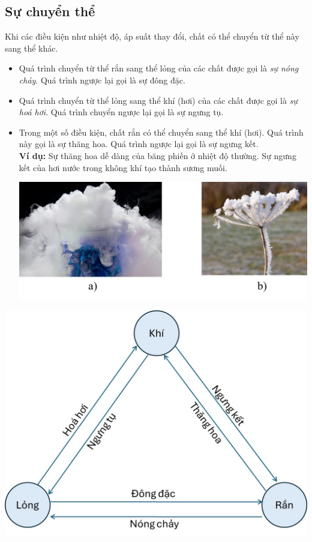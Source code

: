 \subsection{Sự chuyển thể}
Khi các điều kiện như nhiệt độ, áp suất thay đổi, chất có thể chuyển từ thể này sang thể khác.
\begin{itemize}
	\item Quá trình chuyển từ thể rắn sang thể lỏng của các chất được gọi là \textit{sự nóng chảy}. Quá trình ngược lại gọi là sự đông đặc.
	\item Quá trình chuyển từ thể lỏng sang thể khí (hơi) của các chất được gọi là \textit{sự hoá hơi}. Quá trình chuyển ngược lại gọi là sự ngưng tụ.
	\item Trong một số điều kiện, chất rắn có thể chuyển sang thể khí (hơi). Quá trình này gọi là sự thăng hoa. Quá trình ngược lại gọi là sự ngưng kết.\\
	\textbf{Ví dụ:} Sự thăng hoa dễ dàng của băng phiến ở nhiệt độ thường. Sự ngưng kết của hơi nước trong không khí tạo thành sương muối.
	\begin{center}
		\includegraphics[width=0.7\linewidth]{../figs/VN12-Y24-PH-SYL-001-7}
	\end{center}
\end{itemize}
\begin{center}
	\includegraphics[width=0.5\linewidth]{../figs/VN12-Y24-PH-SYL-001-4}
\end{center}
